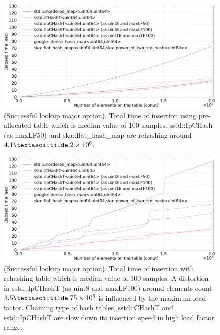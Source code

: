 
\begin{figure}[h]
  \includegraphics[scale=0.24]{./fig_bench_sm/insert_et_preAlloc_med.pdf}
  \caption{
    (Successful lookup major option). Total time of insertion using pre-allocated table which is median value of 100 samples.
    sstd::IpCHash (as maxLF50) and ska::flat\_hash\_map are rehashing around $4.1\textasciitilde.2\times10^6$.
  }
  \label{fig_bench_insert_preAlloc_sm}
\end{figure}

\begin{figure}[h]
  \includegraphics[scale=0.24]{./fig_bench_sm/insert_et_med.pdf}
  \caption{
    (Successful lookup major option). Total time of insertion with rehashing table which is median value of 100 samples.
    A distortion in sstd::IpCHashT (as uint8 and maxLF100) around elements count $3.5 \textasciitilde.75\times10^6$ is influenced by the maximum load factor.
    Chaining type of hash tables, sstd::CHashT and sstd::IpCHashT are slow down its insertion speed in high load factor range.
  }
  \label{fig_bench_insert_wRehash_sm}
\end{figure}

